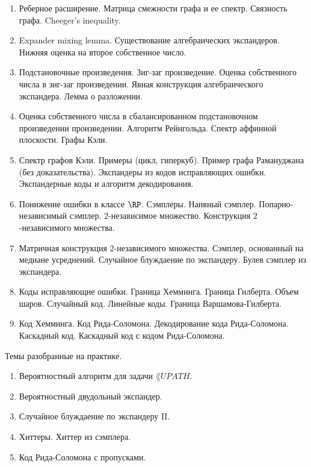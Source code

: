 \begin{enumerate}
    \item Реберное расширение. Матрица смежности графа и ее спектр. Связность графа. Cheeger's inequality.
    \item Expander mixing lemma. Существование алгебраических экспандеров. Нижняя оценка на второе собственное число.
    \item Подстановочные произведения. Зиг-заг произведение. Оценка собственного числа в зиг-заг произведении. Явная
        конструкция алгебраического экспандера. Лемма о разложении. 
    \item Оценка собственного числа в сбалансированном подстановочном произведении произведении. Алгоритм Рейнгольда. Спектр
        аффинной плоскости. Графы Кэли.
    \item Спектр графов Кэли. Примеры (цикл, гиперкуб). Пример графа Рамануджана (без доказательства). Экспандеры из кодов
        исправляющих ошибки. Экспандерные коды и алгоритм декодирования.
    \item Понижение ошибки в классе $\RP$. Сэмплеры. Наивный сэмплер. Попарно-независимый сэмплер. $2$-независимое
        множество. Конструкция $2$-независимого множества.
    \item Матричная конструкция $2$-независимого множества. Сэмплер, основанный на медиане усреднений. Случайное блуждаение
        по экспандеру. Булев сэмплер из экспандера.
    \item Коды исправляющие ошибки. Граница Хемминга. Граница Гилберта. Объем шаров. Случайный код. Линейные коды. Граница
        Варшамова-Гилберта.
    \item Код Хемминга. Код Рида-Соломона. Декодирование кода Рида-Соломона. Каскадный код. Каскадный код с кодом
        Рида-Соломона.
\end{enumerate}

\breakline

Темы разобранные на практике.
\begin{enumerate}
    \item Вероятностный алгоритм для задачи $\lang{UPATH}$.
    \item Вероятностный двудольный экспандер.
    \item Случайное блуждаение по экспандеру II.
    \item Хиттеры. Хиттер из сэмплера.
    \item Код Рида-Соломона с пропусками.
\end{enumerate}